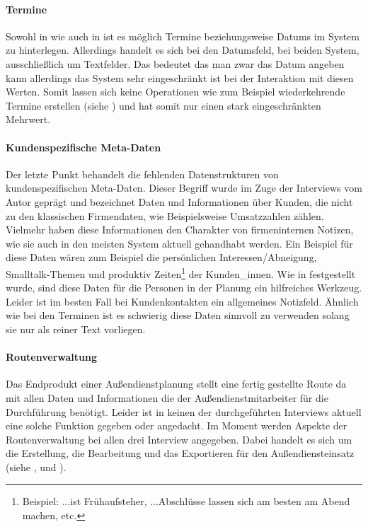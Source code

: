 \documentclass[Bachelorarbeit.tex]{subfiles}
\begin{document}
\paragraph{Termine}
Sowohl in  wie auch in  ist es möglich Termine beziehungsweise Datums im System zu hinterlegen. 
Allerdings handelt es sich bei den Datumsfeld, bei beiden System, ausschließlich um Textfelder. 
Das bedeutet das man zwar das Datum angeben kann allerdings das System sehr eingeschränkt ist bei der Interaktion mit diesen Werten. 
Somit lassen sich keine Operationen wie zum Beispiel wiederkehrende Termine erstellen (siehe ) und hat somit nur einen stark eingeschränkten Mehrwert.


\paragraph{Kundenspezifische Meta-Daten}
Der letzte Punkt behandelt die fehlenden Datenstrukturen von kundenspezifischen Meta-Daten.
Dieser Begriff wurde im Zuge der Interviews vom Autor geprägt und bezeichnet Daten und Informationen über Kunden, die nicht zu den klassischen Firmendaten, wie Beispielsweise Umsatzzahlen zählen. 
Vielmehr haben diese Informationen den Charakter von firmeninternen Notizen, wie sie auch in den meisten System aktuell gehandhabt werden.
Ein Beispiel für diese Daten wären zum Beispiel die persönlichen Interessen/Abneigung, Smalltalk-Themen und produktiv Zeiten\footnote{Beispiel: ...ist Frühaufsteher, ...Abschlüsse lassen sich am besten am Abend machen, etc.} der Kunden\_innen. 
Wie in   festgestellt wurde, sind diese Daten für die Personen in der Planung ein hilfreiches Werkzeug. 
Leider ist im besten Fall bei Kundenkontakten ein allgemeines Notizfeld. 
Ähnlich wie bei den Terminen ist es schwierig diese Daten sinnvoll zu verwenden solang sie nur als reiner Text vorliegen.

\paragraph{Routenverwaltung}
\label{interviewsAnalyseRoutenverwaltung}
Das Endprodukt einer Außendienstplanung stellt eine fertig gestellte Route da mit allen Daten und Informationen die der Außendienstmitarbeiter für die Durchführung benötigt.
Leider ist in keinen der durchgeführten Interviews aktuell eine solche Funktion gegeben oder angedacht.
Im Moment werden Aspekte der Routenverwaltung bei allen drei Interview angegeben.
Dabei handelt es sich um die Erstellung, die Bearbeitung und das Exportieren für den Außendiensteinsatz (siehe ,  und ). 
\end{document}
